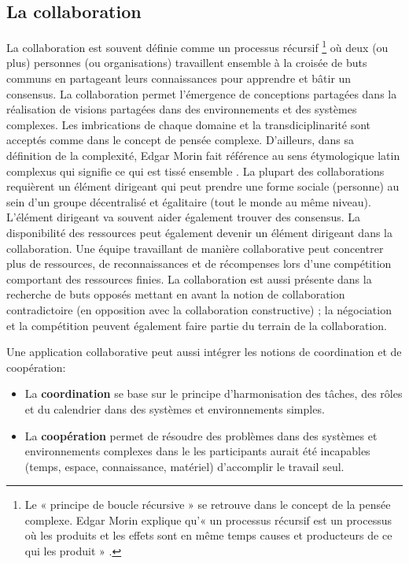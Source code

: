 


\subsection{La collaboration}
La collaboration  est souvent 
définie comme un processus récursif
\footnote{Le « principe de boucle 
	récursive » se retrouve dans le concept de la pensée complexe. Edgar Morin  
	explique qu'« un processus récursif est un processus où les produits et les 
	effets 
	sont en même temps causes et producteurs de ce qui les produit » 
	\cite[p. 100]{Morin1990}.} où deux (ou plus) personnes (ou organisations) 
travaillent ensemble à la croisée de buts communs 
en partageant leurs connaissances pour apprendre et bâtir un consensus. 
La collaboration permet l'émergence de conceptions partagées dans la réalisation 
de visions partagées dans des environnements et des systèmes complexes. 
Les imbrications de chaque domaine et la transdiciplinarité sont acceptés comme 
dans le concept de pensée complexe. D'ailleurs, dans sa définition de la 
complexité, Edgar Morin fait référence au sens étymologique latin \og 
complexus\fg{} qui signifie \og ce qui est tissé ensemble\fg{} \cite{Morin1990a}.
La plupart des collaborations requièrent un élément dirigeant qui peut prendre une 
forme sociale (personne) au sein d'un groupe décentralisé et égalitaire (tout le 
monde au même niveau). L'élément dirigeant va souvent aider également trouver 
des consensus. 
La disponibilité des ressources peut également devenir un élément dirigeant dans 
la collaboration.
Une équipe travaillant de manière collaborative peut concentrer plus de 
ressources, de reconnaissances et de récompenses lors d'une 
compétition comportant des ressources finies. 
La collaboration est aussi présente dans la recherche de buts opposés mettant en 
avant la notion de collaboration contradictoire (en opposition avec la collaboration 
constructive) ; la négociation et la compétition peuvent également faire partie du 
terrain 
de la collaboration.

Une application collaborative peut aussi intégrer les notions de coordination et de 
coopération:
\begin{itemize}
	\item La \textbf{coordination} se base sur le principe d'harmonisation des 
	tâches, des rôles et du calendrier dans des systèmes et environnements 
	simples.
	\item La \textbf{coopération} permet de résoudre des problèmes dans des 
	systèmes et environnements complexes dans le les participants aurait été 
	incapables (temps, espace, connaissance, matériel) d'accomplir le travail seul.
\end{itemize}

